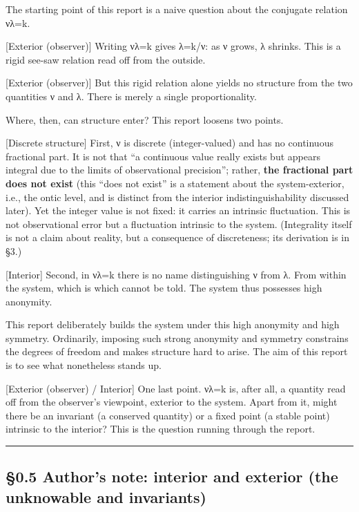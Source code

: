 \documentclass[11pt]{ltjsarticle}
\newcounter{none}
\begin{document}
The starting point of this report is a naive question about the
conjugate relation νλ=k.

{[}Exterior (observer){]} Writing νλ=k gives λ=k/ν: as ν grows, λ
shrinks. This is a rigid see-saw relation read off from the outside.

{[}Exterior (observer){]} But this rigid relation alone yields no
structure from the two quantities ν and λ. There is merely a single
proportionality.

Where, then, can structure enter? This report loosens two points.

{[}Discrete structure{]} First, ν is discrete (integer-valued) and has
no continuous fractional part. It is not that ``a continuous value
really exists but appears integral due to the limits of observational
precision''; rather, \textbf{the fractional part does not exist} (this
``does not exist'' is a statement about the system-exterior, i.e., the
ontic level, and is distinct from the interior indistinguishability
discussed later). Yet the integer value is not fixed: it carries an
intrinsic fluctuation. This is not observational error but a fluctuation
intrinsic to the system. (Integrality itself is not a claim about
reality, but a consequence of discreteness; its derivation is in §3.)

{[}Interior{]} Second, in νλ=k there is no name distinguishing ν from λ.
From within the system, which is which cannot be told. The system thus
possesses high anonymity.

This report deliberately builds the system under this high anonymity and
high symmetry. Ordinarily, imposing such strong anonymity and symmetry
constrains the degrees of freedom and makes structure hard to arise. The
aim of this report is to see what nonetheless stands up.

{[}Exterior (observer) / Interior{]} One last point. νλ=k is, after all,
a quantity read off from the observer's viewpoint, exterior to the
system. Apart from it, might there be an invariant (a conserved
quantity) or a fixed point (a stable point) intrinsic to the interior?
This is the question running through the report.

\begin{center}\rule{0.5\linewidth}{0.5pt}\end{center}

\subsection{§0.5 Author's note: interior and exterior (the unknowable
and
invariants)}\label{authors-note-interior-and-exterior-the-unknowable-and-invariants}
\end{document}
